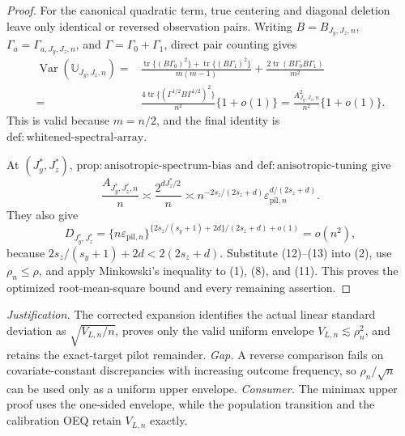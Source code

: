 \documentclass{article}
\begin{document}
\begin{proof}
For the canonical quadratic term, true centering and diagonal deletion leave only identical or reversed observation pairs.  Writing \(B=B_{J_y,J_z,n}\), \(\Gamma_a=\Gamma_{a,J_y,J_z,n}\), and \(\Gamma=\Gamma_0+\Gamma_1\), direct pair counting gives
\begin{equation}
\begin{split}
\operatorname{Var}(\mathbb U_{J_y,J_z,n})={}&
\frac{\operatorname{tr}\{(B\Gamma_0)^2\}+\operatorname{tr}\{(B\Gamma_1)^2\}}{m(m-1)}
+\frac{2\operatorname{tr}(B\Gamma_0B\Gamma_1)}{m^2}\\
={}&\frac{4\operatorname{tr}\{(\Gamma^{1/2}B\Gamma^{1/2})^2\}}{n^2}\{1+o(1)\}
=\frac{A_{J_y,J_z,n}^2}{n^2}\{1+o(1)\}.
\end{split}
\tag{11}\end{equation}
This is valid because \(m=n/2\), and the final identity is \(\mathrm{def{:}whitened\text{-}spectral\text{-}array}\).

At \((J_y^*,J_z^*)\), \(\mathrm{prop{:}anisotropic\text{-}spectrum\text{-}bias}\) and \(\mathrm{def{:}anisotropic\text{-}tuning}\) give
\[
\frac{A_{J_y^*,J_z^*,n}}n
\asymp\frac{2^{dJ_z^*/2}}n
\asymp n^{-2s_z/(2s_z+d)}
\varepsilon_{\mathrm{pil},n}^{d/(2s_z+d)}. \tag{12}
\]
They also give
\[
D_{J_y^*,J_z^*}
=\{n\varepsilon_{\mathrm{pil},n}\}^{\{2s_z/(s_y+1)+2d\}/(2s_z+d)+o(1)}
=o(n^2), \tag{13}
\]
because \(2s_z/(s_y+1)+2d<2(2s_z+d)\).  Substitute (12)--(13) into (2), use \(\rho_n\le\rho\), and apply Minkowski's inequality to (1), (8), and (11).  This proves the optimized root-mean-square bound and every remaining assertion.
\end{proof}
\par\smallskip\noindent \textit{Justification.} The corrected expansion identifies the actual linear standard deviation as \(\sqrt{V_{L,n}/n}\), proves only the valid uniform envelope \(V_{L,n}\lesssim\rho_n^2\), and retains the exact-target pilot remainder. \textit{Gap.} A reverse comparison fails on covariate-constant discrepancies with increasing outcome frequency, so \(\rho_n/\sqrt n\) can be used only as a uniform upper envelope. \textit{Consumer.} The minimax upper proof uses the one-sided envelope, while the population transition and the calibration OEQ retain \(V_{L,n}\) exactly.
\end{document}
